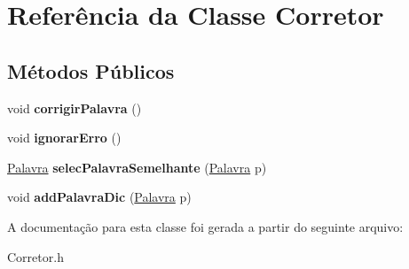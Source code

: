 \hypertarget{classCorretor}{}\section{Referência da Classe Corretor}
\label{classCorretor}
\subsection*{Métodos Públicos}
\begin{DoxyCompactItemize}
\item 
void {\bfseries corrigir\+Palavra} ()\hypertarget{classCorretor_ad8c21144334f38187ba7e7f5c893c0ed}{}\label{classCorretor_ad8c21144334f38187ba7e7f5c893c0ed}

\item 
void {\bfseries ignorar\+Erro} ()\hypertarget{classCorretor_abe691ab7e28b0c628300afa7076c1fe7}{}\label{classCorretor_abe691ab7e28b0c628300afa7076c1fe7}

\item 
\hyperlink{classPalavra}{Palavra} {\bfseries selec\+Palavra\+Semelhante} (\hyperlink{classPalavra}{Palavra} p)\hypertarget{classCorretor_ac5b32fd4f27c6f2221f3b8ff9188f4b7}{}\label{classCorretor_ac5b32fd4f27c6f2221f3b8ff9188f4b7}

\item 
void {\bfseries add\+Palavra\+Dic} (\hyperlink{classPalavra}{Palavra} p)\hypertarget{classCorretor_ad43d884ea23584034efd602e9fc299cc}{}\label{classCorretor_ad43d884ea23584034efd602e9fc299cc}

\end{DoxyCompactItemize}


A documentação para esta classe foi gerada a partir do seguinte arquivo\+:\begin{DoxyCompactItemize}
\item 
Corretor.\+h\end{DoxyCompactItemize}
